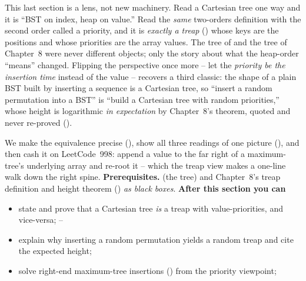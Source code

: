 \begin{topicintro}
This last section is a lens, not new machinery. Read a Cartesian tree one way and it is ``BST on index,
heap on value.'' Read the \emph{same} two-orders definition with the second order called a priority, and
it is \emph{exactly a treap} () whose keys are the positions and whose priorities are
the array values. The tree of  and the tree of Chapter~8 were never different
objects; only the story about what the heap-order ``means'' changed. Flipping the perspective once more
-- let the \emph{priority be the insertion time} instead of the value -- recovers a third classic: the
shape of a plain BST built by inserting a sequence is a Cartesian tree, so ``insert a random permutation
into a BST'' is ``build a Cartesian tree with random priorities,'' whose height is logarithmic \emph{in
expectation} by Chapter~8's theorem, quoted and never re-proved ().

We make the equivalence precise (), show all three readings of one picture
(), and then cash it on LeetCode~998: append a value to the far right of a
maximum-tree's underlying array and re-root it -- which the treap view makes a one-line walk down the
right spine. \textbf{Prerequisites.}  (the tree) and Chapter~8's treap definition
and height theorem () \emph{as black boxes}.
\textbf{After this section you can}
\begin{itemize}[nosep]
  \item state and prove that a Cartesian tree \emph{is} a treap with value-priorities, and vice-versa; \hfill{}--
  \item explain why inserting a random permutation yields a random treap and cite the expected height; \hfill{}
  \item solve right-end maximum-tree insertions () from the priority viewpoint; \hfill{}
\end{itemize}
\end{topicintro}

